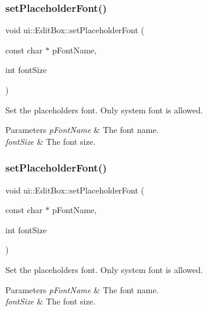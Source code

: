 \subsubsection{\texorpdfstring{set\+Placeholder\+Font()}{setPlaceholderFont()}\hspace{0.1cm}{\footnotesize\ttfamily [1/2]}}
{\footnotesize\ttfamily void ui\+::\+Edit\+Box\+::set\+Placeholder\+Font (\begin{DoxyParamCaption}\item[{const char $\ast$}]{p\+Font\+Name,  }\item[{int}]{font\+Size }\end{DoxyParamCaption})}

Set the placeholder\textquotesingle{}s font. Only system font is allowed. 
\begin{DoxyParams}{Parameters}
{\em p\+Font\+Name} & The font name. \\
\hline
{\em font\+Size} & The font size. \\
\hline
\end{DoxyParams}
\mbox{\label{classui_1_1EditBox_a19ef30f768dcf5d67808e0e67b7809b9}} 
\subsubsection{\texorpdfstring{set\+Placeholder\+Font()}{setPlaceholderFont()}\hspace{0.1cm}{\footnotesize\ttfamily [2/2]}}
{\footnotesize\ttfamily void ui\+::\+Edit\+Box\+::set\+Placeholder\+Font (\begin{DoxyParamCaption}\item[{const char $\ast$}]{p\+Font\+Name,  }\item[{int}]{font\+Size }\end{DoxyParamCaption})}

Set the placeholder\textquotesingle{}s font. Only system font is allowed. 
\begin{DoxyParams}{Parameters}
{\em p\+Font\+Name} & The font name. \\
\hline
{\em font\+Size} & The font size. \\
\hline
\end{DoxyParams}
\mbox{\label{classui_1_1EditBox_a84cdeb802d3ab4e78c036d49a2ffefed}} 
